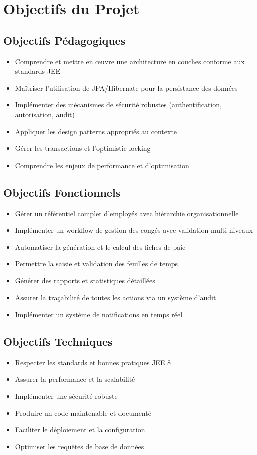 \documentclass[12pt,a4paper,twoside]{report}
\begin{document}
\section{Objectifs du Projet}

\subsection{Objectifs Pédagogiques}
\begin{itemize}
    \item Comprendre et mettre en œuvre une architecture en couches conforme aux standards JEE
    \item Maîtriser l'utilisation de JPA/Hibernate pour la persistance des données
    \item Implémenter des mécanismes de sécurité robustes (authentification, autorisation, audit)
    \item Appliquer les design patterns appropriés au contexte
    \item Gérer les transactions et l'optimistic locking
    \item Comprendre les enjeux de performance et d'optimisation
\end{itemize}

\subsection{Objectifs Fonctionnels}
\begin{itemize}
    \item Gérer un référentiel complet d'employés avec hiérarchie organisationnelle
    \item Implémenter un workflow de gestion des congés avec validation multi-niveaux
    \item Automatiser la génération et le calcul des fiches de paie
    \item Permettre la saisie et validation des feuilles de temps
    \item Générer des rapports et statistiques détaillées
    \item Assurer la traçabilité de toutes les actions via un système d'audit
    \item Implémenter un système de notifications en temps réel
\end{itemize}

\subsection{Objectifs Techniques}
\begin{itemize}
    \item Respecter les standards et bonnes pratiques JEE 8
    \item Assurer la performance et la scalabilité
    \item Implémenter une sécurité robuste
    \item Produire un code maintenable et documenté
    \item Faciliter le déploiement et la configuration
    \item Optimiser les requêtes de base de données
\end{itemize}
\end{document}

